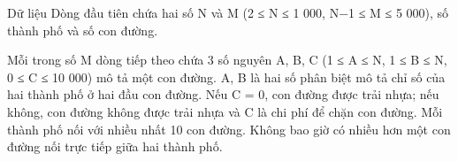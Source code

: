 Dữ liệu
Dòng đầu tiên chứa hai số N và M (2 ≤ N ≤ 1 000, N−1 ≤ M ≤ 5 000), số thành phố và số con đường.  

   Mỗi trong số M dòng tiếp theo chứa 3 số nguyên A, B, C (1 ≤ A ≤ N, 1 ≤ B ≤ N, 0 ≤ C ≤ 10 000) mô tả một con đường. A, B là hai số phân biệt mô tả chỉ số của hai thành phố ở hai đầu con đường. Nếu C = 0, con đường được trải nhựa; nếu không, con đường không được trải nhựa và C là chi phí để chặn con đường. Mỗi thành phố nối với nhiều nhất 10 con đường. Không bao giờ có nhiều hơn một con đường nối trực tiếp giữa hai thành phố.